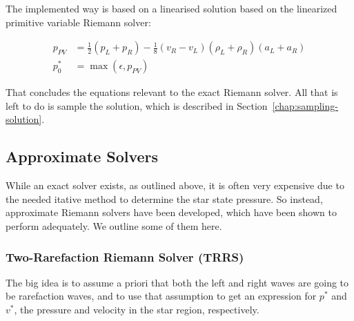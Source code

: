 The implemented way is based on a linearised solution based on the linearized
primitive variable Riemann solver:

\begin{align}
p_{PV} &=
	\frac{1}{2} (p_L + p_R) -
	\frac{1}{8} (v_R - v_L)(\rho_L + \rho_R)(a_L + a_R)\\
	p_0^* &= \max(\epsilon, p_{PV})
\label{eq:pPV}
\end{align}



That concludes the equations relevant to the exact Riemann solver. All that is
left to do is sample the solution, which is described in
Section~\ref{chap:sampling-solution}.






\subsection{Approximate Solvers}\label{chap:riemann-approximate}


While an exact solver exists, as outlined above, it is often very expensive due
to the needed itative method to determine the star state pressure. So instead,
approximate Riemann solvers have been developed, which have been shown to
perform adequately. We outline some of them here.





\subsubsection{Two-Rarefaction Riemann Solver (TRRS)}\label{chap:riemann-trrs}




The big idea is to assume a priori that both the left and right waves are
going to be rarefaction waves, and to use that assumption to get an expression
for $p^*$ and $v^*$, the pressure and velocity in the star region, respectively.

